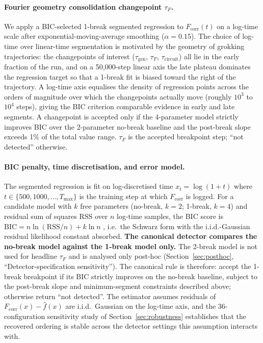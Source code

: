 \documentclass{article}
\newcommand{\taug}{\tau_{\mathrm{gen}}}
\newcommand{\tauf}{\tau_{F}}
\newcommand{\taucirc}{\tau_{\mathrm{circuit}}}
\newcommand{\fcorr}{F_{\mathrm{corr}}}
\begin{document}
\paragraph{Fourier geometry consolidation changepoint $\tauf$.}
We apply a BIC-selected 1-break segmented regression
\citep{schwarz1978estimating} to $\fcorr(t)$ on a log-time scale after
exponential-moving-average smoothing ($\alpha{=}0.15$).
The choice of log-time over linear-time segmentation is motivated
by the geometry of grokking trajectories: the changepoints of
interest ($\taug$, $\tauf$, $\taucirc$) all lie in the early
fraction of the run, and on a 50{,}000-step linear axis the late
plateau dominates the regression target so that a 1-break
fit is biased toward the right of the trajectory.
A log-time axis equalises the density of regression points across
the orders of magnitude over which the changepoints actually move
(roughly $10^{3}$ to $10^{4}$ steps), giving the BIC criterion
comparable evidence in early and late segments.
A changepoint is accepted only if the 4-parameter model strictly
improves BIC over the 2-parameter no-break baseline and the
post-break slope exceeds 1\% of the total value range.
$\tauf$ is the accepted breakpoint step; ``not detected'' otherwise.

\paragraph{BIC penalty, time discretisation, and error model.}
The segmented regression is fit on log-discretised time
$x_t=\log(1+t)$ where $t\in\{500,1000,\dots,T_{\max}\}$ is the
training step at which $\fcorr$ is logged.
For a candidate model with $k$ free parameters (no-break,
$k{=}2$; 1-break, $k{=}4$) and residual sum of squares
$\mathrm{RSS}$ over $n$ log-time samples, the BIC score is
$\mathrm{BIC}=n\ln(\mathrm{RSS}/n)+k\ln n$ \citep{schwarz1978estimating},
i.e.\ the Schwarz form with the i.i.d.-Gaussian residual likelihood
constant absorbed.
\textbf{The canonical detector compares the no-break model
against the 1-break model only.}
The 2-break model is not used for headline $\tauf$ and is
analysed only post-hoc
(Section~\ref{sec:posthoc}, ``Detector-specification sensitivity'').
The canonical rule is therefore: accept the 1-break breakpoint if
its BIC strictly improves on the no-break baseline, subject to the
post-break slope and minimum-segment constraints described above;
otherwise return ``not detected''.
The estimator assumes residuals of $\fcorr(x)-\hat f(x)$ are
i.i.d.\ Gaussian on the log-time axis, and the
36-configuration sensitivity study of
Section~\ref{sec:robustness} establishes that the recovered
ordering is stable across the detector settings this assumption
interacts with.
\end{document}
